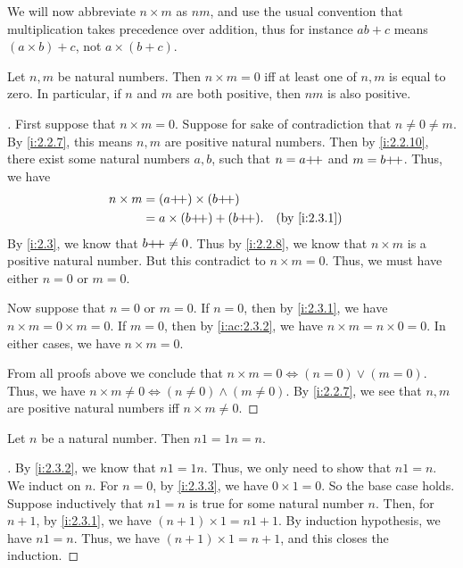 \begin{note}
  We will now abbreviate \(n \times m\) as \(nm\), and use the usual convention that multiplication takes precedence over addition, thus for instance \(ab + c\) means \((a \times b) + c\), not \(a \times (b + c)\).
\end{note}

\begin{lem}\label{i:2.3.3}
  Let \(n, m\) be natural numbers.
  Then \(n \times m = 0\) iff at least one of \(n, m\) is equal to zero.
  In particular, if \(n\) and \(m\) are both positive, then \(nm\) is also positive.
\end{lem}

\begin{proof}[]
  First suppose that \(n \times m = 0\).
  Suppose for sake of contradiction that \(n \neq 0 \neq m\).
  By \cref{i:2.2.7}, this means \(n, m\) are positive natural numbers.
  Then by \cref{i:2.2.10}, there exist some natural numbers \(a, b\), such that \(n = a{+}\!{+}\) and \(m = b{+}\!{+}\).
  Thus, we have
  \begin{align*}
    n \times m & = (a\pp) \times (b\pp)                        \\
               & = a \times (b\pp) + (b\pp). &  & \by{i:2.3.1}
  \end{align*}
  By \cref{i:2.3}, we know that \(b{+}\!{+} \neq 0\).
  Thus by \cref{i:2.2.8}, we know that \(n \times m\) is a positive natural number.
  But this contradict to \(n \times m = 0\).
  Thus, we must have either \(n = 0\) or \(m = 0\).

  Now suppose that \(n = 0\) or \(m = 0\).
  If \(n = 0\), then by \cref{i:2.3.1}, we have \(n \times m = 0 \times m = 0\).
  If \(m = 0\), then by \cref{i:ac:2.3.2}, we have \(n \times m = n \times 0 = 0\).
  In either cases, we have \(n \times m = 0\).

  From all proofs above we conclude that \(n \times m = 0 \iff (n = 0) \lor (m = 0)\).
  Thus, we have \(n \times m \neq 0 \iff (n \neq 0) \land (m \neq 0)\).
  By \cref{i:2.2.7}, we see that \(n, m\) are positive natural numbers iff \(n \times m \neq 0\).
\end{proof}

\begin{ac}\label{i:ac:2.3.4}
  Let \(n\) be a natural number.
  Then \(n1 = 1n = n\).
\end{ac}

\begin{proof}[]
  By \cref{i:2.3.2}, we know that \(n1 = 1n\).
  Thus, we only need to show that \(n1 = n\).
  We induct on \(n\).
  For \(n = 0\), by \cref{i:2.3.3}, we have \(0 \times 1 = 0\).
  So the base case holds.
  Suppose inductively that \(n1 = n\) is true for some natural number \(n\).
  Then, for \(n + 1\), by \cref{i:2.3.1}, we have \((n + 1) \times 1 = n1 + 1\).
  By induction hypothesis, we have \(n1 = n\).
  Thus, we have \((n + 1) \times 1 = n + 1\), and this closes the induction.
\end{proof}

